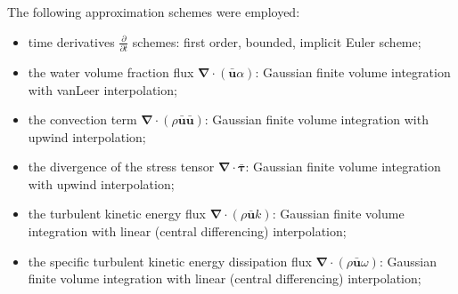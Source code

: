 \documentclass[sensors,article,submit,moreauthors,pdftex]{Definitions/mdpi}
\begin{document}
The following approximation schemes were employed:
\begin{itemize}
	\item time derivatives $\frac{\partial}{\partial t}$ schemes: first order, bounded, implicit Euler scheme;
	\item the water volume fraction flux $\boldsymbol{\nabla} \cdot (\bar{\boldsymbol{u}} \alpha)$: Gaussian finite volume integration with vanLeer interpolation;
	\item the convection term $\boldsymbol{\nabla} \cdot (\rho \bar{\boldsymbol{u}} \bar{\boldsymbol{u}})$: Gaussian finite volume integration with upwind interpolation;
	\item the divergence of the stress tensor $\boldsymbol{\nabla} \cdot \bar{\boldsymbol{\tau}}$: Gaussian finite volume integration with upwind interpolation;
	\item the turbulent kinetic energy flux $\boldsymbol{\nabla} \cdot (\rho \bar{\boldsymbol{u}} k)$: Gaussian finite volume integration with linear (central differencing) interpolation;
	\item the specific turbulent kinetic energy dissipation flux $\boldsymbol{\nabla} \cdot (\rho \bar{\boldsymbol{u}} \omega)$: Gaussian finite volume integration with linear (central differencing) interpolation;

\end{itemize}
\end{document}
